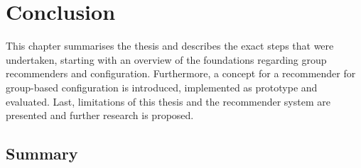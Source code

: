 \chapter{Conclusion}
\label{ch:Conclusion}

This chapter summarises the thesis and describes the exact steps that were undertaken, starting with an overview of the foundations regarding group recommenders and configuration. Furthermore, a concept for a recommender for group-based configuration is introduced, implemented as prototype and evaluated. Last, limitations of this thesis and the recommender system are presented and further research is proposed.

\section{Summary}
\label{sec:Conclusion:Summary}


